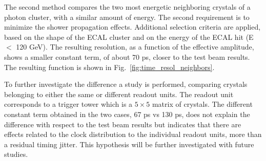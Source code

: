 \documentclass[journal]{IEEEtran}
\begin{document}
The second method compares the two most energetic neighboring crystals of a photon cluster, with a similar amount of energy. The second requirement is to minimize the shower propagation effects. Additional selection criteria are applied, based on the shape of the ECAL cluster and on the energy of the ECAL hit (E $<$ 120 GeV). The resulting resolution, as a function of the effective amplitude, shows a smaller constant term, of about 70 ps, closer to the test beam results. The resulting function is shown in Fig.~\ref{fig:time_resol_neighbors}.

%
To further investigate the difference a study is performed, comparing crystals belonging to either the same or different readout units. The readout unit corresponds to a trigger tower which is a $5 \times 5$ matrix of crystals.  The different constant term obtained in the two cases, 67 ps vs 130 ps, does not explain the difference with respect to the test beam results but indicates that there are effects related to the clock distribution to the individual readout units, more than a residual timing jitter. This hypothesis will be further investigated with future studies.
%
\end{document}
